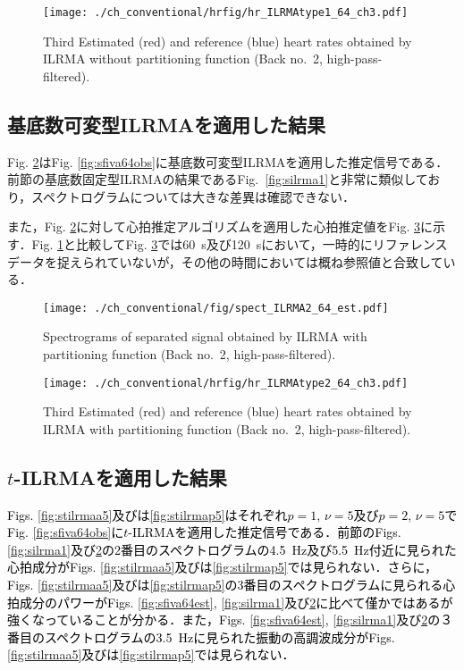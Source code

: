 \begin{figure}[tb]
\centering
\texttt{[image: ./ch\_conventional/hrfig/hr\_ILRMAtype1\_64\_ch3.pdf]}
\caption{Third Estimated (red) and reference (blue) heart rates obtained by ILRMA without partitioning function (Back no.~2, high-pass-filtered).}
\label{fig:hrilrma1}
\end{figure}

\subsection{基底数可変型ILRMAを適用した結果}
\label{sec:conv:resultilrma2}
Fig. \ref{fig:silrma2}はFig. \ref{fig:sfiva64obs}に基底数可変型ILRMAを適用した推定信号である．前節の基底数固定型ILRMAの結果であるFig.~\ref{fig:silrma1}と非常に類似しており，スペクトログラムについては大きな差異は確認できない．

また，Fig. \ref{fig:silrma2}に対して心拍推定アルゴリズムを適用した心拍推定値をFig. \ref{fig:hrilrma2}に示す．Fig. \ref{fig:hrilrma1}と比較してFig. \ref{fig:hrilrma2}では60~s及び120~sにおいて，一時的にリファレンスデータを捉えられていないが，その他の時間においては概ね参照値と合致している．

\begin{figure}[tb]
\centering
\texttt{[image: ./ch\_conventional/fig/spect\_ILRMA2\_64\_est.pdf]}
\caption{Spectrograms of separated signal obtained by ILRMA with partitioning function (Back no.~2, high-pass-filtered).}
\label{fig:silrma2}
\end{figure}

\begin{figure}[tb]
\centering
\texttt{[image: ./ch\_conventional/hrfig/hr\_ILRMAtype2\_64\_ch3.pdf]}
\caption{Third Estimated (red) and reference (blue) heart rates obtained by ILRMA with partitioning function (Back no.~2, high-pass-filtered).}
\label{fig:hrilrma2}
\end{figure}

\subsection{$t$-ILRMAを適用した結果}
\label{sec:conv:resulttilrma}
\textcolor{black}{Figs. \ref{fig:stilrmaa5}及びは\ref{fig:stilrmap5}はそれぞれ$p=1$, $\nu = 5$及び$p=2$, $\nu = 5$でFig. \ref{fig:sfiva64obs}に$t$-ILRMAを適用した推定信号である．前節のFigs. \ref{fig:silrma1}及び\ref{fig:silrma2}の2番目のスペクトログラムの4.5~Hz及び5.5~Hz付近に見られた心拍成分がFigs. \ref{fig:stilrmaa5}及びは\ref{fig:stilrmap5}では見られない．さらに，Figs. \ref{fig:stilrmaa5}及びは\ref{fig:stilrmap5}の3番目のスペクトログラムに見られる心拍成分のパワーがFigs. \ref{fig:sfiva64est}, \ref{fig:silrma1}及び\ref{fig:silrma2}に比べて僅かではあるが強くなっていることが分かる．また，Figs. \ref{fig:sfiva64est}, \ref{fig:silrma1}及び\ref{fig:silrma2}の３番目のスペクトログラムの3.5~Hzに見られた振動の高調波成分がFigs. \ref{fig:stilrmaa5}及びは\ref{fig:stilrmap5}では見られない．}

